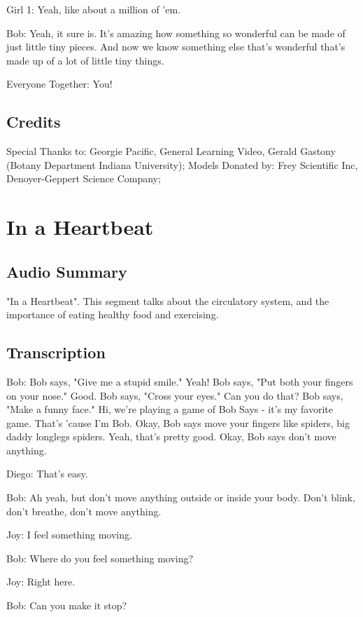 Girl 1: Yeah, like about a million of 'em.

Bob: Yeah, it sure is. It's amazing how something so wonderful can be made of just little tiny pieces. And now we know something else that's wonderful that's made up of a lot of little tiny things.

Everyone Together: You!

\subsection{Credits}

Special Thanks to: Georgie Pacific, General Learning Video, Gerald Gastony (Botany Department Indiana University);
Models Donated by: Frey Scientific Inc, Denoyer-Geppert Science Company;

\section{In a Heartbeat}

\subsection{Audio Summary}

"In a Heartbeat". This segment talks about the circulatory system, and the importance of eating healthy food and exercising.

\subsection{Transcription}

Bob: Bob says, "Give me a stupid smile." Yeah! Bob says, "Put both your fingers on your nose." Good. Bob says, "Cross your eyes." Can you do that? Bob says, "Make a funny face." Hi, we're playing a game of Bob Says - it's my favorite game. That's 'cause I'm Bob. Okay, Bob says move your fingers like spiders, big daddy longlegs spiders. Yeah, that's pretty good. Okay, Bob says don't move anything.

Diego: That's easy.

Bob: Ah yeah, but don't move anything outside or inside your body. Don't blink, don't breathe, don't move anything.

Joy: I feel something moving.

Bob: Where do you feel something moving?

Joy: Right here.

Bob: Can you make it stop?

